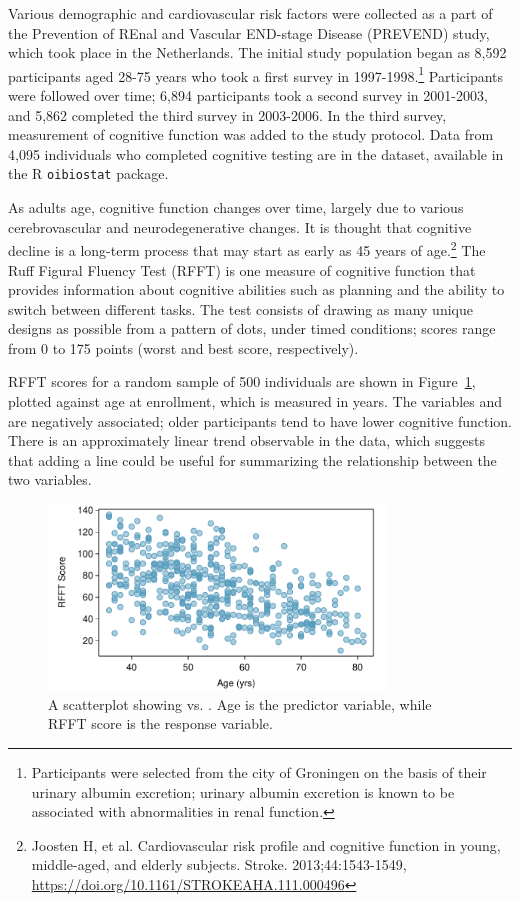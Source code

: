 Various demographic and cardiovascular risk factors were collected as a part of the Prevention of REnal and Vascular END-stage Disease (PREVEND) study, which took place in the Netherlands. The initial study population began as 8,592 participants aged 28-75 years who took a first survey in 1997-1998.\footnote{Participants were selected from the city of Groningen on the basis of their urinary albumin excretion; urinary albumin excretion is known to be associated with abnormalities in renal function.} Participants were followed over time; 6,894 participants took a second survey in 2001-2003, and 5,862 completed the third survey in 2003-2006. In the third survey, measurement of cognitive function was added to the study protocol. Data from 4,095 individuals who completed cognitive testing are in the  dataset, available in the \textsf{R} \texttt{oibiostat} package. 

As adults age, cognitive function changes over time, largely due to various cerebrovascular and neurodegenerative changes. It is thought that cognitive decline is a long-term process that may start as early as 45 years of age.\footnote{Joosten H, et al. Cardiovascular risk profile and cognitive function in young, middle-aged, and elderly subjects. Stroke. 2013;44:1543-1549, \url{https://doi.org/10.1161/STROKEAHA.111.000496} } The Ruff Figural Fluency Test (RFFT) is one measure of cognitive function that provides information about cognitive abilities such as planning and the ability to switch between different tasks. The test consists of drawing as many unique designs as possible from a pattern of dots, under timed conditions; scores range from 0 to 175 points (worst and best score, respectively).

RFFT scores for a random sample of 500 individuals are shown in Figure~\ref{prevendAgeRFFT}, plotted against age at enrollment, which is measured in years. The variables  and  are negatively associated; older participants tend to have lower cognitive function. There is an approximately linear trend observable in the data, which suggests that adding a line could be useful for summarizing the relationship between the two variables.

\begin{figure}[h!]
	\centering
	\includegraphics[width=0.8\textwidth]
	{ch_simple_linear_regression_oi_biostat/figures/prevendAgeRFFTPlot/prevendAgeRFFTPlot}
	\caption{A scatterplot showing  vs. . Age is the predictor variable, while RFFT score is the response variable.}
	\label{prevendAgeRFFT}
\end{figure}

